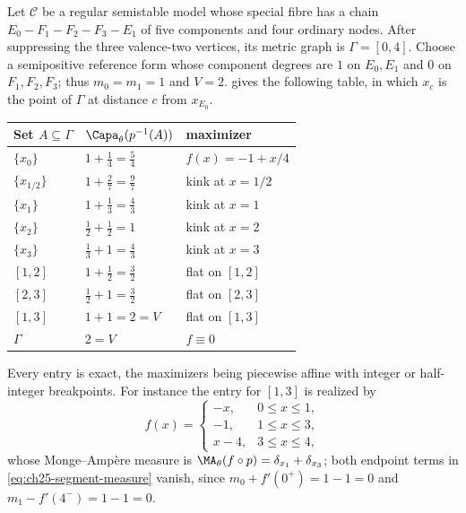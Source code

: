 \begin{example}
\label{ex:ch25-segment-capacities}
Let $\mathcal C$ be a regular semistable model whose special fibre has a
chain $E_0-F_1-F_2-F_3-E_1$ of five components and four ordinary nodes.
After suppressing the three valence-two vertices, its metric graph is
$\Gamma=[0,4]$.  Choose a semipositive reference form whose component
degrees are $1$ on $E_0,E_1$ and $0$ on $F_1,F_2,F_3$; thus
$m_0=m_1=1$ and $V=2$.  
gives the following table, in which $x_c$ is the point of $\Gamma$ at
distance $c$ from $x_{E_0}$.

\begin{center}
\small
\begin{tabular}{l|l|l}
\toprule
\textbf{Set }$A\subseteq\Gamma$&$\Capa_\theta(p^{-1}(A))$
 &\textbf{maximizer}\\
\midrule
$\{x_0\}$&$1+\tfrac14=\tfrac54$&$f(x)=-1+x/4$\\
$\{x_{1/2}\}$&$1+\tfrac27=\tfrac97$&kink at $x=1/2$\\
$\{x_1\}$&$1+\tfrac13=\tfrac43$&kink at $x=1$\\
$\{x_2\}$&$\tfrac12+\tfrac12=1$&kink at $x=2$\\
$\{x_3\}$&$\tfrac13+1=\tfrac43$&kink at $x=3$\\
$[1,2]$&$1+\tfrac12=\tfrac32$&flat on $[1,2]$\\
$[2,3]$&$\tfrac12+1=\tfrac32$&flat on $[2,3]$\\
$[1,3]$&$1+1=2=V$&flat on $[1,3]$\\
$\Gamma$&$2=V$&$f\equiv0$\\
\bottomrule
\end{tabular}
\end{center}

Every entry is exact, the maximizers being piecewise affine with integer or
half-integer breakpoints.  For instance the entry for $[1,3]$ is realized
by
\[
 f(x)=\begin{cases}-x,&0\leq x\leq1,\\ -1,&1\leq x\leq3,\\
  x-4,&3\leq x\leq4,\end{cases}
\]
whose Monge--Amp\`ere measure is
$\MA_\theta(f\circ p)=\delta_{x_1}+\delta_{x_3}$; both endpoint terms in
\eqref{eq:ch25-segment-measure} vanish, since
$m_0+f'(0^+)=1-1=0$ and $m_1-f'(4^-)=1-1=0$.


\end{example}
